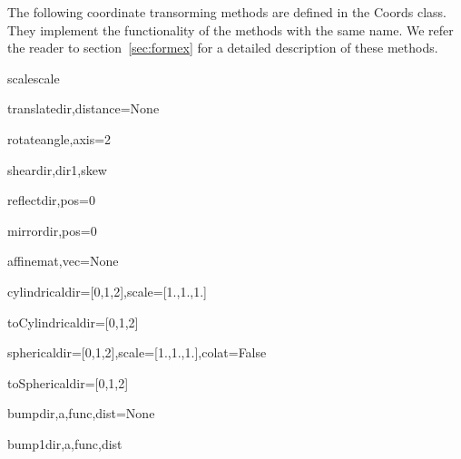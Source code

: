 The following coordinate transorming methods are defined in the Coords class.
They implement the functionality of the  methods with the same name. We refer the reader to section~\ref{sec:formex} for a detailed description of these methods. 
\begin{methoddesc}{scale}{scale}
\end{methoddesc}

\begin{methoddesc}{translate}{dir,distance=None}
\end{methoddesc}

\begin{methoddesc}{rotate}{angle,axis=2}
\end{methoddesc}

\begin{methoddesc}{shear}{dir,dir1,skew}
\end{methoddesc}

\begin{methoddesc}{reflect}{dir,pos=0}
\end{methoddesc}

\begin{methoddesc}{mirror}{dir,pos=0}
\end{methoddesc}

\begin{methoddesc}{affine}{mat,vec=None}
\end{methoddesc}


\begin{methoddesc}{cylindrical}{dir=[0,1,2],scale=[1.,1.,1.]}
\end{methoddesc}

\begin{methoddesc}{toCylindrical}{dir=[0,1,2]}
\end{methoddesc}

\begin{methoddesc}{spherical}{dir=[0,1,2],scale=[1.,1.,1.],colat=False}
\end{methoddesc}

\begin{methoddesc}{toSpherical}{dir=[0,1,2]}
\end{methoddesc}

\begin{methoddesc}{bump}{dir,a,func,dist=None}
\end{methoddesc}

\begin{methoddesc}{bump1}{dir,a,func,dist}
\end{methoddesc}

